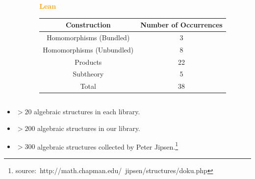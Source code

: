 \documentclass[t,10pt,numbers,fleqn,usenames,xcolor=dvipsnames]{beamer}
\begin{document}
\begin{frame}[fragile]
\begin{columns}
\begin{column}{0.45\textwidth}
\end{column} 
\begin{column}{0.45\textwidth}
\textcolor{Orange}{\textbf{Lean}}
\begin{table}
\begin{adjustbox}{width=0.9\columnwidth}
\begin{tabular}{| c || c |}
\hline 
\textbf{Construction} & \textbf{Number of Occurrences} \\ \hline 
Homomorphisms (Bundled) & 3 \\ \hline
Homomorphisms (Unbundled)& 8  \\ \hline
Products & 22 \\ \hline
Subtheory & 5 \\ \hline\hline 
Total & 38 \\ \hline 
\end{tabular}
\end{adjustbox}
\end{table} 
\end{column} 
\end{columns}
\begin{itemize}
\item $> 20$ algebraic structures in each library.
\pause  
\item $>200$ algebraic structures in our library.
\item $>300$ algebraic structures collected by Peter Jipsen.\only<+->\footnote{source:~http://math.chapman.edu/~jipsen/structures/doku.php}
\end{itemize}
\end{frame}
\end{document}
